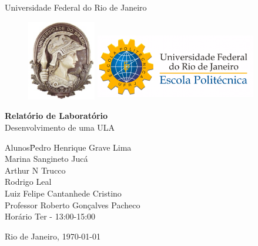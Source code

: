 \documentclass[a4paper, 12pt]{article}
\begin{document}

\begin{titlepage}
	\begin{center}
		\huge{Universidade Federal do Rio de Janeiro}

\vspace{10pt}
\begin{figure}[!ht]
\centering
\includegraphics[width=3cm]{minerva.eps}
\hspace{3cm}
\includegraphics[height=3cm, width=7cm]{poli-logo.pdf}
\end{figure}
        
        \vspace{85pt}
        
		\textbf{\LARGE{Relatório de Laboratório}}
		\large{\\
        		Desenvolvimento de uma ULA}
		\vspace{160pt}
		
	\end{center}
	
	\begin{flushleft}
		\begin{tabbing}
			Alunos\qquad\qquad\= Pedro Henrique Grave Lima\\
			\>Marina Sangineto Jucá\\
            \> Arthur N Trucco\\
            \> Rodrigo Leal \\
            \> Luiz Felipe Cantanhede Cristino \\
			Professor\> Roberto Gonçalves Pacheco \\
			Horário\> Ter - 13:00-15:00\\
		
	\end{tabbing}
		  
	\end{flushleft}
	
	\begin{center}
		\vspace{\fill}
		Rio de Janeiro, \today
	\end{center}
\end{titlepage}
\newpage
\tableofcontents
\thispagestyle{empty}
\end{document}
